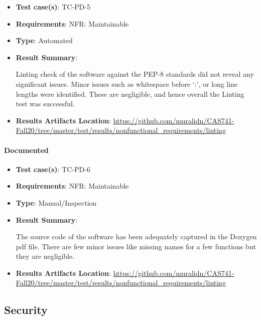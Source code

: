 \documentclass[12pt, titlepage]{article}
\begin{document}
\begin{itemize}

\item \textbf{Test case(s)}: TC-PD-5

\item \textbf{Requirements}: NFR: Maintainable

\item \textbf{Type}: Automated

\item \textbf{Result Summary}: 

 Linting check of the  \progname{} software against 
the PEP-8  standards did not reveal any significant issues. Minor issues such 
as whitespace before `:', or long line lengths were identified. These are 
negligible, and hence overall the Linting test was successful.

 \item \textbf{Results Artifacts Location}: \url{https://github.com/muralidn/CAS741-Fall20/tree/master/test/results/nonfunctional_requirements/linting}

\end{itemize}

\paragraph{Documented} 

\begin{itemize}

\item \textbf{Test case(s)}: TC-PD-6

\item \textbf{Requirements}: NFR: Maintainable

\item \textbf{Type}: Manual/Inspection

\item \textbf{Result Summary}: 

The source code of the \progname{} software has been 
adequately captured in the Doxygen pdf file. There are few minor issues like missing
 names for a few functions but they are negligible.

 \item \textbf{Results Artifacts Location}: \url{https://github.com/muralidn/CAS741-Fall20/tree/master/test/results/nonfunctional_requirements/linting}

\end{itemize}

\subsection{Security}
\end{document}

